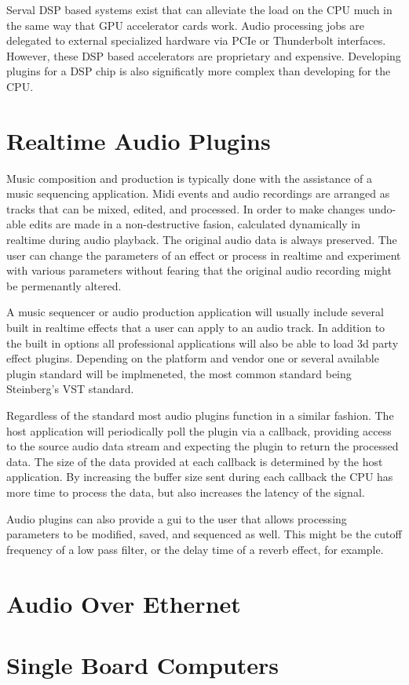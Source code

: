 Serval DSP based systems exist that can alleviate the load on the CPU much in the same way that GPU accelerator cards work. Audio processing jobs are delegated to external specialized hardware via PCIe or Thunderbolt interfaces. However, these DSP based accelerators are proprietary and expensive. Developing plugins for a DSP chip is also significatly more complex than developing for the CPU.

\section{Realtime Audio Plugins}

Music composition and production is typically done with the assistance of a music sequencing application. Midi events
 and audio recordings are arranged as tracks that can be mixed, edited, and processed. In order to make changes
 undo-able edits are made in a non-destructive fasion, calculated dynamically in realtime during audio playback. The
 original audio data is always preserved. The user can change the parameters of an effect or process in realtime and
 experiment with various parameters without fearing that the original audio recording might be permenantly altered.

A music sequencer or audio production application will usually include several built in realtime effects that a user
can apply to an audio track. In addition to the built in options all professional applications will also be able to
load 3d party effect plugins. Depending on the platform and vendor one or several available plugin standard will be
implmeneted, the most common standard being Steinberg's VST standard.

Regardless of the standard most audio plugins function in a similar fashion. The host application will periodically
poll the plugin via a callback, providing access to the source audio data stream and expecting the plugin to return the
 processed data. The size of the data provided at each callback is determined by the host application. By increasing the
 buffer size sent during each callback the CPU has more time to process the data, but also increases the latency of
 the signal.

 Audio plugins can also provide a gui to the user that allows processing parameters to be modified, saved, and
 sequenced as well. This might be the cutoff frequency of a low pass filter, or the delay time of a reverb effect,
 for example.

\section{Audio Over Ethernet}

\section{Single Board Computers}